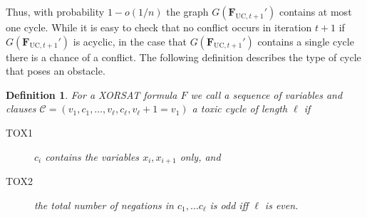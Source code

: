 \documentclass[10pt,reqno]{amsart}
\numberwithin{equation}{section}
\newcommand{\tox}{\cC}
\newcommand{\toxl}{\tox}
\renewcommand{\vec}[1]{\boldsymbol{#1}}
\newcommand{\FUC}[1]{\PHI_{\mathrm{UC},{#1}}}
\newcommand\PHI{\vec F}
\newcommand\cC{\mathcal C}
\newtheorem{definition}{Definition}[section]
\begin{document}
Thus, with probability $1-o(1/n)$ the graph $G(\FUC{t+1}')$ contains at most one cycle.
While it is easy to check that no conflict occurs in iteration $t+1$ if $G(\FUC{t+1}')$ is acyclic, in the case that $G(\FUC{t+1}')$ contains a single cycle there is a chance of a conflict.
The following definition describes the type of cycle that poses an obstacle.

\begin{definition}
	For a XORSAT formula $F$ we call a sequence of variables and clauses $\toxl=(v_1, c_1, \dots, v_\ell, c_\ell, v_\ell+1=v_1)$ a \emph{toxic cycle} of length $\ell$ if 
	\begin{description}
		\item[TOX1] $c_i$ contains the variables $x_i, x_{i+1}$ only, and
		\item[TOX2] the total number of negations in $c_1, \dots c_\ell$ is odd iff $\ell$ is even.
	\end{description}
\end{definition}
\end{document}
